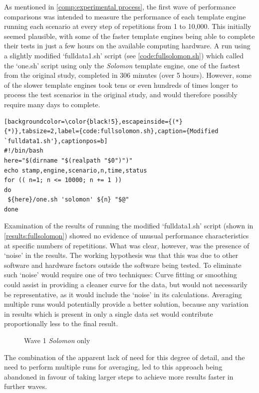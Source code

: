 As mentioned in \autoref{comp:experimental process}, the first wave of performance comparisons was intended to measure the performance of each template engine running each scenario at every step of repetitions from 1 to 10,000. This initially seemed plausible, with some of the faster template engines being able to complete their tests in just a few hours on the available computing hardware. A run using a slightly modified `fulldata1.sh' script  (see \autoref{code:fullsolomon.sh}) which called the `one.sh' script using only the \emph{Solomon} template engine, one of the fastest from the original study, completed in 306 minutes (over 5 hours). However, some of the slower template engines took tens or even hundreds of times longer to process the test scenarios in the original study, and would therefore possibly require many days to complete.

\begin{lstlisting}[backgroundcolor=\color{black!5},escapeinside={(*}{*)},tabsize=2,label={code:fullsolomon.sh},caption={Modified `fulldata1.sh'},captionpos=b]
#!/bin/bash
here="$(dirname "$(realpath "$0")")"
echo stamp,engine,scenario,n,time,status
for (( n=1; n <= 10000; n += 1 ))
do
 ${here}/one.sh 'solomon' ${n} "$@"
done
\end{lstlisting}

Examination of the results of running the modified `fulldata1.sh' script (shown in \autoref{results:fullsolomon}) showed no evidence of unusual performance characteristics at specific numbers of repetitions. What was clear, however, was the presence of `noise' in the results. The working hypothesis was that this was due to other software and hardware factors outside the software being tested. To eliminate such `noise' would require one of two techniques: Curve fitting or smoothing could assist in providing a cleaner curve for the data, but would not necessarily be representative, as it would include the `noise' in its calculations. Averaging multiple runs would potentially provide a better solution, because any variation in results which is present in only a single data set would contribute proportionally less to the final result.

\begin{figure}[ht!]
\centering

\caption{\label{results:fullsolomon}Wave 1 \emph{Solomon} only}
\end{figure}

The combination of the apparent lack of need for this degree of detail, and the need to perform multiple runs for averaging, led to this approach being abandoned in favour of taking larger steps to achieve more results faster in further waves.

